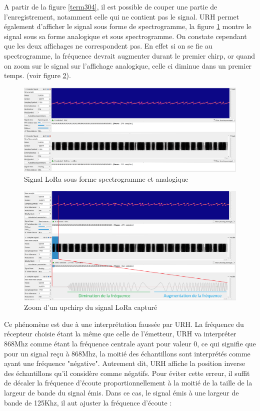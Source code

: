 A partir de la figure \ref{term304}, il est possible de couper une partie de l'enregistrement, notamment celle qui ne contient pas le signal. URH permet également d'afficher le signal sous forme de spectrogramme, la figure \ref{term306} montre le signal sous sa forme analogique et sous spectrogramme. On constate cependant que les deux affichages ne correspondent pas. En effet si on se fie au spectrogramme, la fréquence devrait augmenter durant le premier chirp, or quand on zoom sur le signal sur l'affichage analogique, celle ci diminue dans un premier temps. (voir figure \ref{term307}).

\newpage

\begin{figure}[h]
\centering

\includegraphics[scale=0.11]{images/urh4.png}
\caption{Signal LoRa sous forme spectrogramme et analogique}\label{term306}
\end{figure}

\begin{figure}[h]
\centering

\includegraphics[scale=0.18]{images/urh5.png}
\caption{Zoom d'un upchirp du signal LoRa capturé}\label{term307}
\end{figure}

Ce phénomène est due à une interprétation faussée par URH. La fréquence du récepteur choisie étant la même que celle de l'émetteur, URH va interpréter 868Mhz comme étant la fréquence centrale ayant pour valeur 0, ce qui signifie que pour un signal reçu à 868Mhz, la moitié des échantillons sont interprétés comme ayant une fréquence "négative". Autrement dit, URH affiche la position inverse des échantillons qu'il considère comme négatifs. Pour éviter cette erreur, il suffit de décaler la fréquence d'écoute proportionnellement à la moitié de la taille de la largeur de bande du signal émis. Dans ce cas, le signal émis à une largeur de bande de 125Khz, il aut ajuster la fréquence d'écoute :

